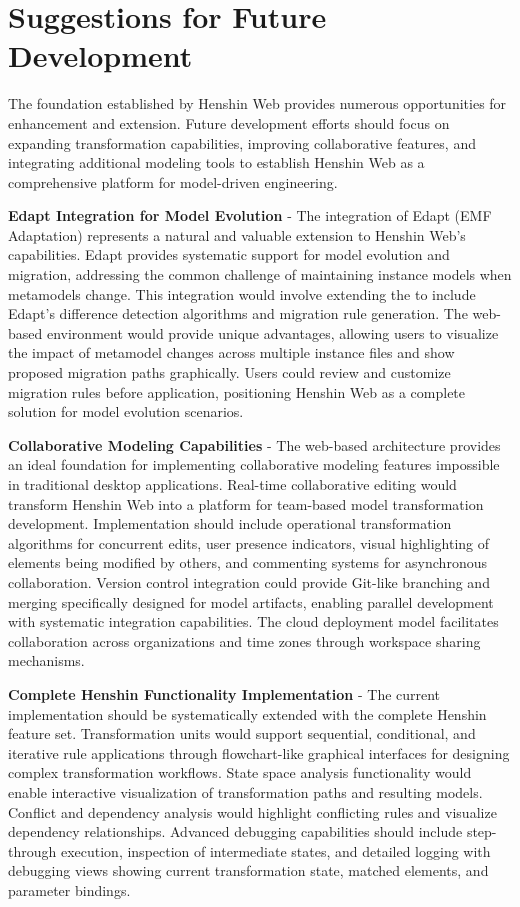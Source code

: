   \section{Suggestions for Future Development}
  \label{subsec:suggestions-future-development}

  The foundation established by Henshin Web provides numerous opportunities for enhancement and extension. Future development efforts should focus on expanding transformation capabilities, improving collaborative features, and integrating additional modeling tools to establish Henshin Web as a comprehensive platform for model-driven engineering.

  \textbf{Edapt Integration for Model Evolution} - The integration of Edapt (EMF Adaptation) represents a natural and valuable extension to Henshin Web's capabilities. Edapt provides systematic support for model evolution and migration, addressing the common challenge of maintaining instance models when metamodels change. This integration would involve extending the  to include Edapt's difference detection algorithms and migration rule generation. The web-based environment would provide unique advantages, allowing users to visualize the impact of metamodel changes across multiple instance files and show proposed migration paths graphically. Users could review and customize migration rules before application, positioning Henshin Web as a complete solution for model evolution scenarios.

  \textbf{Collaborative Modeling Capabilities} - The web-based architecture provides an ideal foundation for implementing collaborative modeling features impossible in traditional desktop applications. Real-time collaborative editing would transform Henshin Web into a platform for team-based model transformation development. Implementation should include operational transformation algorithms for concurrent edits, user presence indicators, visual highlighting of elements being modified by others, and commenting systems for asynchronous collaboration. Version control integration could provide Git-like branching and merging specifically designed for model artifacts, enabling parallel development with systematic integration capabilities. The cloud deployment model facilitates collaboration across organizations and time zones through workspace sharing mechanisms.

  \textbf{Complete Henshin Functionality Implementation} - The current implementation should be systematically extended with the complete Henshin feature set. Transformation units would support sequential, conditional, and iterative rule applications through flowchart-like graphical interfaces for designing complex transformation workflows. State space analysis functionality would enable interactive visualization of transformation paths and resulting models. Conflict and dependency analysis would highlight conflicting rules and visualize dependency relationships. Advanced debugging capabilities should include step-through execution, inspection of intermediate states, and detailed logging with debugging views showing current transformation state, matched elements, and parameter bindings.

